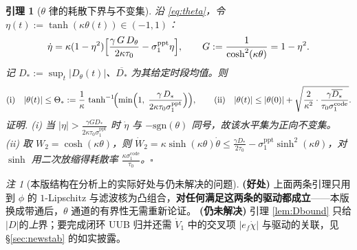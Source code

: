 \documentclass[11pt]{article}
\newtheorem{lemma}{引理}
\theoremstyle{remark}\newtheorem{remark}{注}
\newcommand{\sone}{\sigma_1^{\mathrm{ppt}}}
\newcommand{\ath}{\operatorname{tanh}^{-1}}
\begin{document}
\begin{lemma}[$\theta$ 律的耗散下界与不变集]\label{lem:thetadiss}
沿 \eqref{eq:theta}，令 $\eta(t):=\tanh(\kappa\theta(t))\in(-1,1)$：
\begin{equation}
  \dot\eta=\kappa(1-\eta^{2})\Bigl[\frac{\gamma\,G\,D_\theta}{2\kappa\tau_0}-\sone\eta\Bigr],
  \qquad G:=\frac{1}{\cosh^{2}(\kappa\theta)}=1-\eta^{2}.
  \label{eq:eta}
\end{equation}
记 $D_*:=\sup_t|D_\theta(t)|$、$\overline{D_*}$ 为其给定时段均值。则
\begin{equation}
  \text{(i)}\quad |\theta(t)|\le\Theta_*:=\frac{1}{\kappa}\,\ath\!\Bigl(\min\Bigl(1,\;\frac{\gamma\,D_*}{2\kappa\tau_0\sone}\Bigr)\Bigr),
  \qquad
  \text{(ii)}\quad |\theta(t)|\le|\theta(0)|+\sqrt{\frac{2}{\kappa^{2}}\cdot\frac{\gamma\overline{D_*}}{\tau_0\sigma_1^{\mathrm{code}}}} .
  \label{eq:thetabound}
\end{equation}
\emph{证明.} (i) 当 $|\eta|>\frac{\gamma GD_*}{2\kappa\tau_0\sone}$ 时 $\dot\eta$ 与 $-\mathrm{sgn}(\theta)$ 同号，故该水平集为正向不变集。
(ii) 取 $W_2=\cosh(\kappa\theta)$，则 $\dot W_2=\kappa\sinh(\kappa\theta)\dot\theta\le\frac{\gamma D_*}{2\tau_0}-\sone\sinh^{2}(\kappa\theta)$，对 $\sinh$ 用二次放缩得耗散率 $\frac{\kappa\sigma_1^{\mathrm{code}}}{\tau_0}$。$\square$
\end{lemma}
\begin{remark}[本版结构在分析上的实际好处与仍未解决的问题]\label{rem:robust}
\textbf{(好处)} 上面两条引理只用到 $\phi$ 的 $1$-Lipschitz 与滤波核为凸组合，\textbf{对任何满足这两条的驱动都成立}——本版换成带通后，$\theta$ 通道的有界性无需重新论证。
\textbf{(仍未解决)} 引理 \ref{lem:Dbound} 只给$|D|$的\emph{上}界；要完成闭环 UUB 归并还需 $\dot V_1$ 中的交叉项 $|e_f\dot\chi|$ 与驱动的关联，见 \S\ref{sec:newstab} 的如实披露。
\end{remark}
\end{document}
